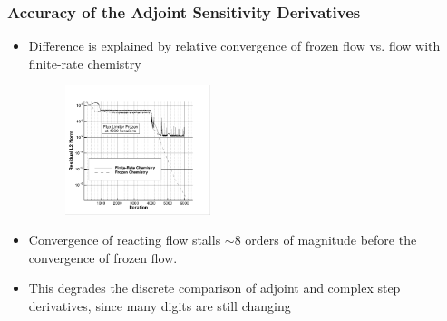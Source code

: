 \documentclass{beamer}
\begin{document}
\begin{frame}
  \frametitle{Accuracy of the Adjoint Sensitivity Derivatives}
  \begin{itemize}
    \item Difference is explained by relative convergence of frozen flow vs.
      flow with finite-rate chemistry
  \begin{figure}
    \centering
    \includegraphics[width=0.4\textwidth]{figures/limiters/chem-res-comp.png}
  \end{figure}
    \item Convergence of reacting flow stalls $\sim 8$ orders of magnitude
      before the convergence of frozen flow.
    \item This degrades the discrete comparison of adjoint and complex step
      derivatives, since many digits are still changing
  \end{itemize}
\end{frame}
\end{document}
